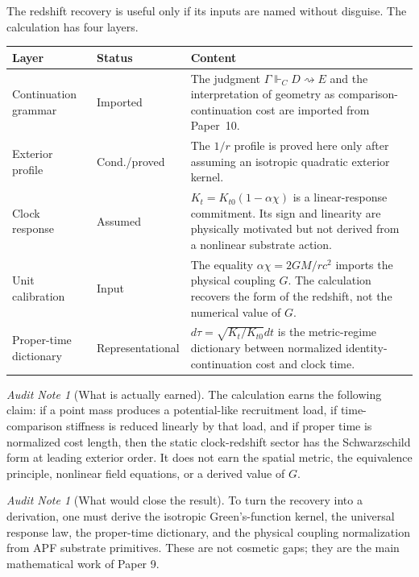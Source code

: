 \documentclass[11pt]{article}
\theoremstyle{remark}
\newtheorem{audit}[theorem]{Audit Note}
\newcommand{\G}{\Gamma}
\newcommand{\entails}{\Vdash}
\newcommand{\goes}{\rightsquigarrow}
\newcommand{\Status}[1]{\textsf{#1}}
\begin{document}
The redshift recovery is useful only if its inputs are named without disguise.  The calculation has four layers.

\begin{longtable}{p{}p{}p{}}
\toprule
Layer & Status & Content \\
\midrule
Continuation grammar & \Status{Imported} & The judgment \(\G\entails_C D\goes E\) and the interpretation of geometry as comparison-continuation cost are imported from Paper~10. \\
Exterior profile & \Status{Cond./proved} & The \(1/r\) profile is proved here only after assuming an isotropic quadratic exterior kernel. \\
Clock response & \Status{Assumed} & \(K_t=K_{t0}(1-\alpha\chi)\) is a linear-response commitment. Its sign and linearity are physically motivated but not derived from a nonlinear substrate action. \\
Unit calibration & \Status{Input} & The equality \(\alpha\chi=2GM/rc^2\) imports the physical coupling \(G\). The calculation recovers the form of the redshift, not the numerical value of \(G\). \\
Proper-time dictionary & \Status{Representational} & \(d\tau=\sqrt{K_t/K_{t0}}dt\) is the metric-regime dictionary between normalized identity-continuation cost and clock time. \\
\bottomrule
\end{longtable}

\begin{audit}[What is actually earned]
The calculation earns the following claim: if a point mass produces a potential-like recruitment load, if time-comparison stiffness is reduced linearly by that load, and if proper time is normalized cost length, then the static clock-redshift sector has the Schwarzschild form at leading exterior order.  It does not earn the spatial metric, the equivalence principle, nonlinear field equations, or a derived value of \(G\).
\end{audit}

\begin{audit}[What would close the result]
To turn the recovery into a derivation, one must derive the isotropic Green's-function kernel, the universal response law, the proper-time dictionary, and the physical coupling normalization from APF substrate primitives.  These are not cosmetic gaps; they are the main mathematical work of Paper 9.
\end{audit}
\end{document}
